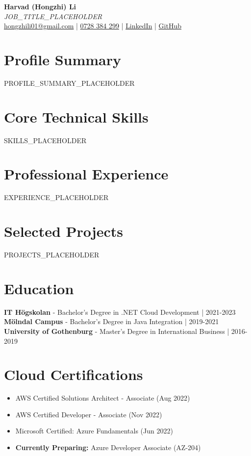 \documentclass[11pt,a4paper]{article}
\begin{document}
\pagestyle{empty} %

\begin{center}
{\LARGE \textbf{Harvad (Hongzhi) Li}}\\[10pt]
{\Large \textit{JOB_TITLE_PLACEHOLDER}}\\[10pt]
\textcolor{linkedinblue}{\href{mailto:hongzhili01@gmail.com}{hongzhili01@gmail.com} | \href{tel:0728384299}{0728 384 299} | \href{https://www.linkedin.com/in/harvad/}{LinkedIn} | \href{https://github.com/bluehawana}{GitHub}}
\end{center}

\section*{Profile Summary}
PROFILE_SUMMARY_PLACEHOLDER

\section*{Core Technical Skills}
SKILLS_PLACEHOLDER

\section*{Professional Experience}
EXPERIENCE_PLACEHOLDER

\section*{Selected Projects}
PROJECTS_PLACEHOLDER

\section*{Education}
\textbf{IT Högskolan} - Bachelor's Degree in .NET Cloud Development | 2021-2023\\
\textbf{Mölndal Campus} - Bachelor's Degree in Java Integration | 2019-2021\\
\textbf{University of Gothenburg} - Master's Degree in International Business | 2016-2019

\section*{Cloud Certifications}
\begin{itemize}[noitemsep]
\item AWS Certified Solutions Architect - Associate (Aug 2022)
\item AWS Certified Developer - Associate (Nov 2022)
\item Microsoft Certified: Azure Fundamentals (Jun 2022)
\item \textbf{Currently Preparing:} Azure Developer Associate (AZ-204)
\end{itemize}
\end{document}
